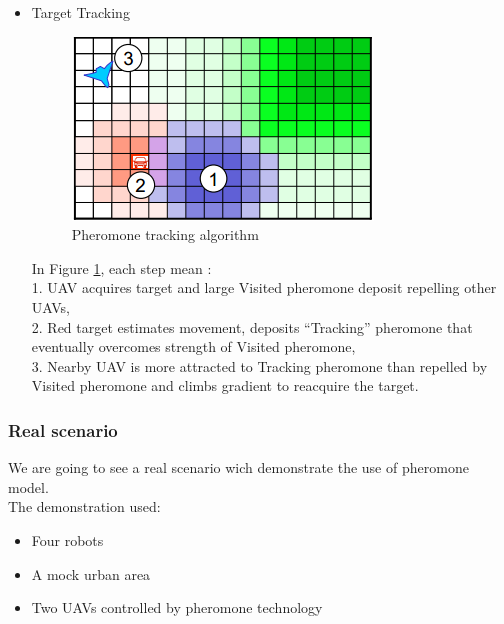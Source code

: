 \begin{itemize}
In Figure \ref{targetacquisition}, each step mean :\\
1. UAVdet detects target and Red target is created,\\
2. Red target deposits “NeedsID” pheromone, \\
3. UAVid is more attracted to NeedsID pheromone than lawn pheromone and climbs gradient to ID target.

\newpage

\item Target Tracking

\begin{figure}[h]
\center
\includegraphics[scale=0.7]{../images/pheromone_tracking.png}
\caption{\label{tracking} Pheromone tracking algorithm}
\end{figure}

In Figure \ref{tracking}, each step mean :\\
1. UAV acquires target and large Visited pheromone deposit repelling 
other UAVs,\\
2. Red target estimates movement, deposits “Tracking” pheromone that eventually overcomes strength of Visited pheromone, \\
3. Nearby UAV is more attracted to Tracking pheromone than repelled by Visited pheromone and climbs gradient to reacquire the target. 
\end{itemize}

\newpage

\subsubsection{Real scenario}

We are going to see a real scenario wich demonstrate the use of pheromone model.\\
The demonstration used: 

\begin{itemize}
\item Four robots 
\item A mock urban area  
\item Two UAVs controlled by pheromone technology 
\end{itemize}

